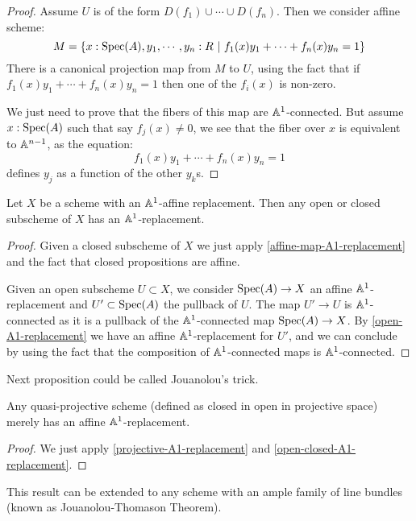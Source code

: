 \begin{proof}
Assume $U$ is of the form $D(f_1)\cup \cdots \cup D(f_n)$. Then we consider affine scheme:
\[M = \{x:\operatorname{Spec}(A),y_1,\cdots, y_n:R\ |\ f_1(x)y_1 + \cdots + f_n(x)y_n = 1\}\]
There is a canonical projection map from $M$ to $U$, using the fact that if $f_1(x)y_1 + \cdots + f_n(x)y_n = 1$ then one of the $f_i(x)$ is non-zero.

We just need to prove that the fibers of this map are $\mathbb{A}^1$-connected. But assume $x:\operatorname{Spec}(A)$ such that say $f_j(x)\not=0$, we see that the fiber over $x$ is equivalent to $\mathbb{A}^{n-1}$, as the equation:
\[f_1(x)y_1 + \cdots + f_n(x)y_n = 1\]
defines $y_j$ as a function of the other $y_k$s.
\end{proof}

\begin{proposition}\label{open-closed-A1-replacement}
Let $X$ be a scheme with an $\mathbb{A}^1$-affine replacement. Then any open or closed subscheme of $X$ has an $\mathbb{A}^1$-replacement.
\end{proposition}

\begin{proof}
Given a closed subscheme of $X$ we just apply \cref{affine-map-A1-replacement} and the fact that closed propositions are affine.

Given an open subscheme $U\subset X$, we consider $\operatorname{Spec}(A)\to X$ an affine $\mathbb{A}^1$-replacement and $U'\subset \operatorname{Spec}(A)$ the pullback of $U$. The map $U'\to U$ is $\mathbb{A}^1$-connected as it is a pullback of the $\mathbb{A}^1$-connected map $\operatorname{Spec}(A)\to X$. By \cref{open-A1-replacement} we have an affine $\mathbb{A}^1$-replacement for $U'$, and we can conclude by using the fact that the composition of $\mathbb{A}^1$-connected maps is $\mathbb{A}^1$-connected.
\end{proof}

Next proposition could be called Jouanolou's trick.

\begin{proposition}
Any quasi-projective scheme (defined as closed in open in projective space) merely has an affine $\mathbb{A}^1$-replacement.
\end{proposition}

\begin{proof}
We just apply \cref{projective-A1-replacement} and \cref{open-closed-A1-replacement}.
\end{proof}

\begin{remark}
This result can be extended to any scheme with an ample family of line bundles (known as Jouanolou-Thomason Theorem).
\end{remark}


